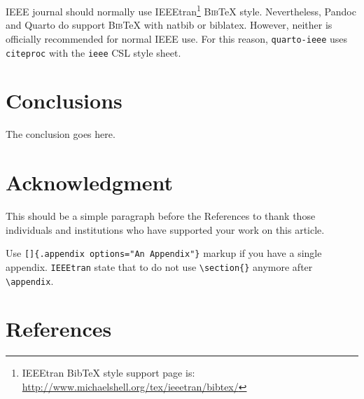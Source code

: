 \documentclass[
  journal,
]{IEEEtran}%
\theoremstyle{plain}
\theoremstyle{remark}
\begin{document}
IEEE journal should normally use IEEEtran\footnote{IEEEtran BibTeX style
  support page is:
  \url{http://www.michaelshell.org/tex/ieeetran/bibtex/}}
\textsc{Bib}{\TeX} style. Nevertheless, Pandoc and Quarto do support
\textsc{Bib}{\TeX} with natbib or biblatex. However, neither is
officially recommended for normal IEEE use. For this reason,
\texttt{quarto-ieee} uses \texttt{citeproc} with the \texttt{ieee} CSL
style sheet.

\hypertarget{conclusions}{%
\section{Conclusions}\label{conclusions}}

The conclusion goes here.

\hypertarget{acknowledgment}{%
\section*{Acknowledgment}\label{acknowledgment}}

This should be a simple paragraph before the References to thank those
individuals and institutions who have supported your work on this
article.

\appendix[An Appendix]{}

Use \texttt{{[}{]}\{.appendix\ options="An\ Appendix"\}} markup if you
have a single appendix. \texttt{IEEEtran} state that to do not use
\texttt{\textbackslash{}section\{\}} anymore after
\texttt{\textbackslash{}appendix}.

\hypertarget{references}{%
\section*{References}\label{references}}
\end{document}
